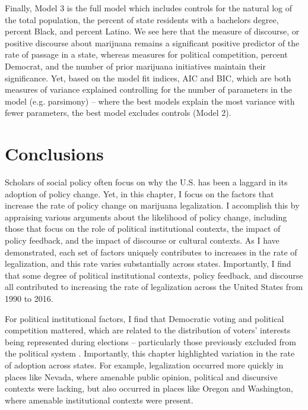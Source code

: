Finally, Model 3 is the full model which includes controls for the natural log of the total population, the percent of state residents with a bachelors degree, percent Black, and percent Latino. We see here that the measure of discourse, or positive discourse about marijuana remains a significant positive predictor of the rate of passage in a state, whereas measures for political competition, percent Democrat, and the number of prior marijuana initiatives maintain their significance. Yet, based on the model fit indices, AIC and BIC, which are both measures of variance explained controlling for the number of parameters in the model (e.g. parsimony) -- where the best models explain the most variance with fewer parameters, the best model excludes controls (Model 2).


\section{Conclusions}

Scholars of social policy often focus on why the U.S. has been a laggard in its adoption of policy change.  Yet, in this chapter, I focus on the factors that increase the rate of policy change on marijuana legalization. I accomplish this by appraising various arguments about the likelihood of policy change, including those that focus on the role of political institutional contexts, the impact of policy feedback, and the impact of discourse or cultural contexts. As I have demonstrated, each set of factors uniquely contributes to increases in the rate of legalization, and this rate varies substantially across states. Importantly, I find that some degree of political institutional contexts, policy feedback, and discourse all contributed to increasing the rate of legalization across the United States from 1990 to 2016. 

For political institutional factors, I find that Democratic voting and political competition mattered, which are related to the distribution of voters' interests being represented during elections -- particularly those previously excluded from the political system \citep{soule_and_olzak_2004}. Importantly, this chapter highlighted variation in the rate of adoption across states. For example, legalization occurred more quickly in places like Nevada, where amenable public opinion, political and discursive contexts were lacking, but also occurred in places like Oregon and Washington, where amenable institutional contexts were present. %

